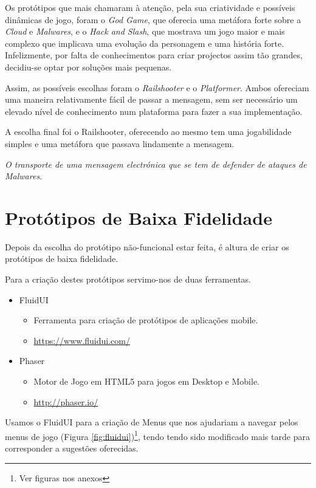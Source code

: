 Os protótipos que mais chamaram à atenção, pela sua criatividade e possíveis dinâmicas de jogo, foram o \textit{God Game}, que oferecia uma metáfora forte sobre a \textit{Cloud} e \textit{Malwares}, e o \textit{Hack and Slash}, que mostrava um jogo maior e mais complexo que implicava uma evolução da personagem e uma história forte. Infelizmente, por falta de conhecimentos para criar projectos assim tão grandes, decidiu-se optar por soluções mais pequenas.

Assim, as possíveis escolhas foram o \textit{Railshooter} e o \textit{Platformer}. Ambos ofereciam uma maneira relativamente fácil de passar a mensagem, sem ser necessário um elevado nível de conhecimento num plataforma para fazer a sua implementação.

A escolha final foi o Railshooter, oferecendo ao mesmo tem uma jogabilidade simples e uma metáfora que passava lindamente a mensagem.

\emph{O transporte de uma mensagem electrónica que se tem de defender de ataques de Malwares.}

\section{Protótipos de Baixa Fidelidade}

Depois da escolha do protótipo não-funcional estar feita, é altura de criar os protótipos de baixa fidelidade.

Para a criação destes protótipos servimo-nos de duas ferramentas.
\begin{itemize}
\item FluidUI
\begin{itemize}
\item Ferramenta para criação de protótipos de aplicações mobile.
\item \url{https://www.fluidui.com/}
\end{itemize}
\item Phaser
\begin{itemize}
\item Motor de Jogo em HTML5 para jogos em Desktop e Mobile.
\item \url{http://phaser.io/}
\end{itemize}
\end{itemize}

Usamos o FluidUI para a criação de Menus que nos ajudariam a navegar pelos menus de jogo (Figura \ref{fig:fluidui})\footnote{Ver figuras nos anexos}, tendo tendo sido modificado mais tarde para corresponder a sugestões oferecidas.

